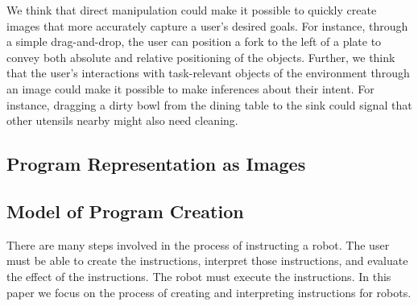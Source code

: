 We think that direct manipulation could make it possible to quickly create images that more accurately capture a user's desired goals. For instance, through a simple drag-and-drop, the user can position a fork to the left of a plate to convey both absolute and relative positioning of the objects. Further, we think that the user's interactions with task-relevant objects of the environment through an image could make it possible to make inferences about their intent. For instance, dragging a dirty bowl from the dining table to the sink could signal that other utensils nearby might also need cleaning.

\subsection{Program Representation as Images}

\subsection{Model of Program Creation}


There are many steps involved in the process of instructing a robot. The user must be able to create the instructions, interpret those instructions, and evaluate the effect of the instructions. The robot must execute the instructions. In this paper we focus on the process of creating and interpreting instructions for robots. 

